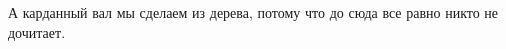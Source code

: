 \conclusion
\label{cha:conclusion}

А карданный вал мы сделаем из дерева, потому что до сюда все равно никто не дочитает.


